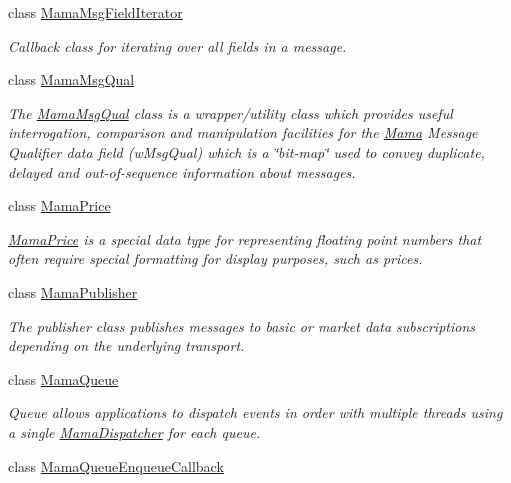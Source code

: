 \begin{DoxyCompactItemize}
class \hyperlink{classWombat_1_1MamaMsgFieldIterator}{MamaMsgFieldIterator}
\begin{DoxyCompactList}\small\item\em Callback class for iterating over all fields in a message. \item\end{DoxyCompactList}\item 
class \hyperlink{classWombat_1_1MamaMsgQual}{MamaMsgQual}
\begin{DoxyCompactList}\small\item\em The \hyperlink{classWombat_1_1MamaMsgQual}{MamaMsgQual} class is a wrapper/utility class which provides useful interrogation, comparison and manipulation facilities for the \hyperlink{classWombat_1_1Mama}{Mama} Message Qualifier data field (wMsgQual) which is a \char`\"{}bit-\/map\char`\"{} used to convey duplicate, delayed and out-\/of-\/sequence information about messages. \item\end{DoxyCompactList}\item 
class \hyperlink{classWombat_1_1MamaPrice}{MamaPrice}
\begin{DoxyCompactList}\small\item\em \hyperlink{classWombat_1_1MamaPrice}{MamaPrice} is a special data type for representing floating point numbers that often require special formatting for display purposes, such as prices. \item\end{DoxyCompactList}\item 
class \hyperlink{classWombat_1_1MamaPublisher}{MamaPublisher}
\begin{DoxyCompactList}\small\item\em The publisher class publishes messages to basic or market data subscriptions depending on the underlying transport. \item\end{DoxyCompactList}\item 
class \hyperlink{classWombat_1_1MamaQueue}{MamaQueue}
\begin{DoxyCompactList}\small\item\em Queue allows applications to dispatch events in order with multiple threads using a single \hyperlink{classWombat_1_1MamaDispatcher}{MamaDispatcher} for each queue. \item\end{DoxyCompactList}\item 
class \hyperlink{classWombat_1_1MamaQueueEnqueueCallback}{MamaQueueEnqueueCallback}

\end{DoxyCompactItemize}
